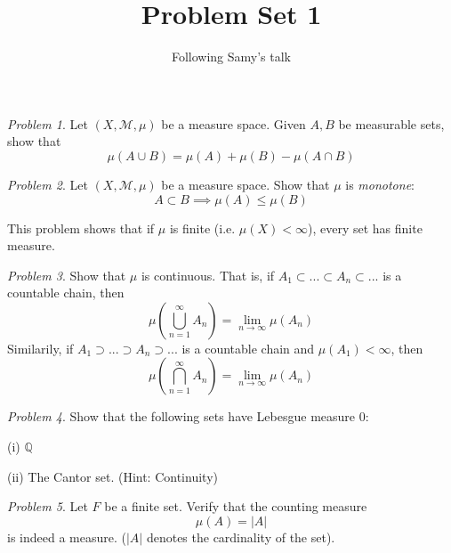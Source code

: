 \documentclass[11pt]{article}
\title{Problem Set 1}
\author{Following Samy's talk}
\date{}
\theoremstyle{definition}
\theoremstyle{example}
\theoremstyle{remark}
\theoremstyle{lemma}
\theoremstyle{proposition}
\theoremstyle{Problem}
\newtheorem{problem}{Problem}[section]
\theoremstyle{Solution}
\theoremstyle{theorem}
\theoremstyle{corollary}
\begin{document}
\maketitle
\begin{problem}
Let $(X,\mathcal{M},\mu)$ be a measure space. Given $A,B$ be measurable sets, show that $$\mu(A\cup B) = \mu(A)+\mu(B) - \mu(A\cap B)$$
\end{problem}

\begin{problem}
Let $(X,\mathcal{M},\mu)$ be a measure space. Show that $\mu$ is \emph{monotone}:
$$A\subset B \implies \mu(A) \leq \mu(B)$$
\end{problem}
This problem shows that if $\mu$ is finite (i.e. $\mu(X) <\infty$), every set has finite measure.

\begin{problem}
Show that $\mu$ is continuous. That is, if $A_1\subset ... \subset A_n \subset ...$ is a countable chain, then $$\mu\left(\bigcup_{n=1}^{\infty} A_n\right) = \lim_{n\to \infty} \mu(A_n)$$
Similarily, if $A_1 \supset  ... \supset A_n \supset ...$ is a countable chain and $\mu(A_1)<\infty$, then
$$\mu\left(\bigcap_{n=1}^{\infty} A_n\right) = \lim_{n\to \infty} \mu(A_n)$$
\end{problem}

\begin{problem}
Show that the following sets have Lebesgue measure $0$:

(i) $\mathbb{Q}$ 

(ii) The Cantor set. (Hint: Continuity)

\end{problem}

\begin{problem}
Let $F$ be a finite set. Verify that the counting measure 
$$\mu(A) = |A|$$
is indeed a measure. ($|A|$ denotes the cardinality of the set).
\end{problem}
\end{document}
